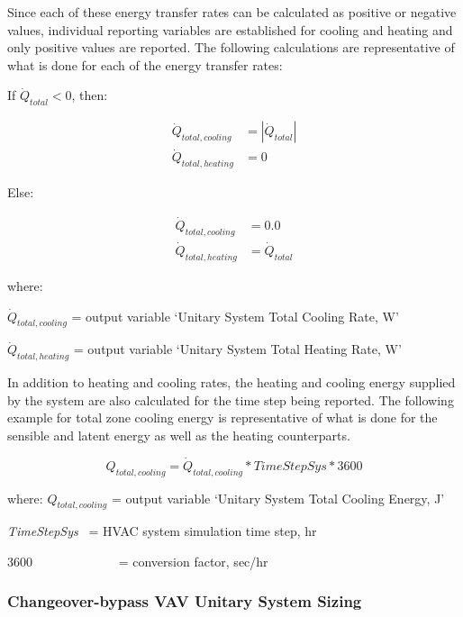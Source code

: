 Since each of these energy transfer rates can be calculated as positive or negative values, individual reporting variables are established for cooling and heating and only positive values are reported. The following calculations are representative of what is done for each of the energy transfer rates:

If $\dot{Q}_{total}<0$, then:

\begin{equation}
  \begin{array}{rl}
    \dot{Q}_{total,cooling} &= \left|\dot{Q}_{total}\right| \\
    \dot{Q}_{total,heating} &= 0
  \end{array}
\end{equation}

Else:

\begin{equation} 
  \begin{array}{rl}
    \dot{Q}_{total,cooling} &= 0.0 \\
    \dot{Q}_{total,heating} &= \dot{Q}_{total}
  \end{array}
\end{equation}

where:

\(\dot{Q}_{total,cooling}\) = output variable `Unitary System Total Cooling Rate, W'

\(\dot{Q}_{total,heating}\) = output variable `Unitary System Total Heating Rate, W'

In addition to heating and cooling rates, the heating and cooling energy supplied by the system are also calculated for the time step being reported. The following example for total zone cooling energy is representative of what is done for the sensible and latent energy as well as the heating counterparts.

\begin{equation}
{Q_{total,cooling}} = {\dot Q_{total,cooling}}*TimeStepSys*3600
\end{equation}

where: \(Q_{total,cooling}\) = output variable `Unitary System Total Cooling Energy, J'

\emph{TimeStepSys}~ = HVAC system simulation time step, hr

3600~~~~~~~~~~~~~ = conversion factor, sec/hr

\subsubsection{Changeover-bypass VAV Unitary System Sizing}\label{changeover-bypass-vav-unitary-system-sizing}

